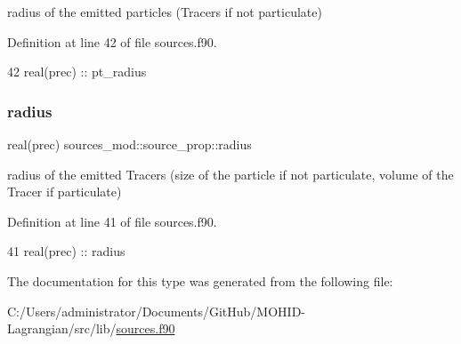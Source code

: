 radius of the emitted particles (Tracers if not particulate) 



Definition at line 42 of file sources.\+f90.


\begin{DoxyCode}
42         \textcolor{keywordtype}{real(prec)} :: pt\_radius
\end{DoxyCode}
\mbox{\label{structsources__mod_1_1source__prop_af4cc47a1f8a8d28088150eba368d80a5}} 
\subsubsection{\texorpdfstring{radius}{radius}}
{\footnotesize\ttfamily real(prec) sources\+\_\+mod\+::source\+\_\+prop\+::radius\hspace{0.3cm}{\ttfamily [private]}}



radius of the emitted Tracers (size of the particle if not particulate, volume of the Tracer if particulate) 



Definition at line 41 of file sources.\+f90.


\begin{DoxyCode}
41         \textcolor{keywordtype}{real(prec)} :: radius
\end{DoxyCode}


The documentation for this type was generated from the following file\+:\begin{DoxyCompactItemize}
\item 
C\+:/\+Users/administrator/\+Documents/\+Git\+Hub/\+M\+O\+H\+I\+D-\/\+Lagrangian/src/lib/\mbox{\hyperlink{sources_8f90}{sources.\+f90}}\end{DoxyCompactItemize}

